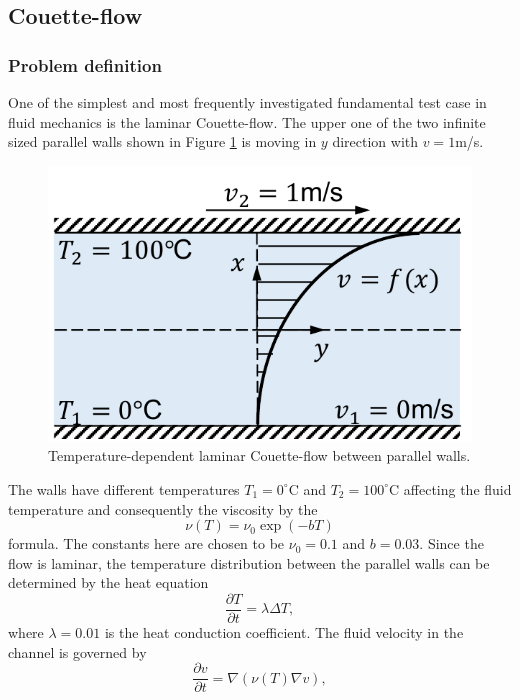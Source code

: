 \documentclass[a4paper,12pt,openany]{book}
\theoremstyle{break}
\begin{document}
\subsection{Couette-flow}
\subsubsection{Problem definition}
One of the simplest and most frequently investigated fundamental test case in fluid mechanics is the laminar Couette-flow. The upper one of the two infinite sized parallel walls shown in Figure \ref{fig:couette} is moving in $y$ direction with $v=1$m/s.
\begin{figure}[h!]
  \includegraphics[scale=0.7]{couette.pdf}
  \centering
  \caption{Temperature-dependent laminar Couette-flow between parallel walls.}
  \label{fig:couette}
\end{figure}\vspace*{3pt}
The walls have different temperatures $T_1=0^\circ$C and $T_2=100^\circ$C affecting the fluid temperature and consequently the viscosity by the
\begin{equation}
\nu(T)=\nu_0 \exp(-bT)
\end{equation}
formula. The constants here are chosen to be $\nu_0=0.1$ and $b=0.03$. Since the flow is laminar, the temperature distribution between the parallel walls can be determined by the heat equation
\begin{equation} \label{eq:couette_laplace}
\frac{\partial T}{\partial t}=\lambda\Delta T,
\end{equation}
where $\lambda=0.01$ is the heat conduction coefficient. The fluid velocity in the channel is governed by 
\begin{equation} \label{eq:couette_eom}
\frac{\partial v}{\partial t}=\nabla(\nu(T)\nabla v),
\end{equation}
\end{document}

